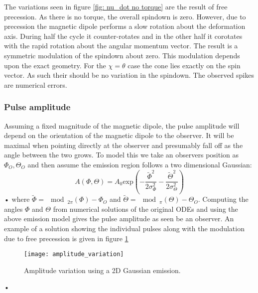 \documentclass[/home/greg/Thesis/main/main.tex]{subfiles}
\begin{document}
The variations seen in figure \ref{fig: nu_dot no torque} are the result of
free precession. As there is no torque, the overall spindown is zero. However,
due to precession the magnetic dipole performs a slow rotation about the
deformation axis. During half the cycle it counter-rotates and in the other
half it corotates with the rapid rotation about the angular momentum vector.
The result is a symmetric modulation of the spindown about zero. This
modulation depends upon the exact geometry. For the $\chi=\theta$ case the cone
lies exactly on the spin vector. As such their should be no variation in the
spindown. The observed spikes are numerical errors.

\subsubsection{Pulse amplitude}
Assuming a fixed magnitude of the magnetic dipole, the pulse amplitude will 
depend on the orientation of the magnetic dipole to the observer. It will be 
maximal when pointing directly at the observer and presumably fall off as the
angle between the two grows. To model this we take an observers position as 
$\Phi_{O}, \Theta_{O}$ and then assume the emission region follows
a two dimensional Gaussian:
\begin{equation}
A(\Phi, \Theta) = A_{0} \textrm{exp} \left(
                         -\frac{\tilde{\Phi}^{2}}{2\sigma_{\Phi}^{2}}
                         -\frac{\tilde{\Theta}^{2}}{2\sigma_{\Theta}^{2}}
                                     \right)
\label{eqn: Amplitude}
\end{equation}•
where $\tilde{\Phi}=\mod_{2\pi}(\Phi)-\Phi_{O}$ and 
$\tilde{\Theta}=\mod_{\pi}(\Theta) - \Theta_{O}$. Computing the angles $\Phi$ and $\Theta$ from numerical
solutions of the original ODEs and using the above emission model gives 
the pulse amplitude as seen be an observer. An example of a solution showing
the individual pulses along with the modulation due to free precession is
given in figure \ref{fig: amplitude_variation}
\begin{figure}[htb]
\centering
\texttt{[image: amplitude\_variation]}
\caption{Amplitude variation using a 2D Gaussian emission.}
\label{fig: amplitude_variation}
\end{figure}•

\FloatBarrier
\end{document}
